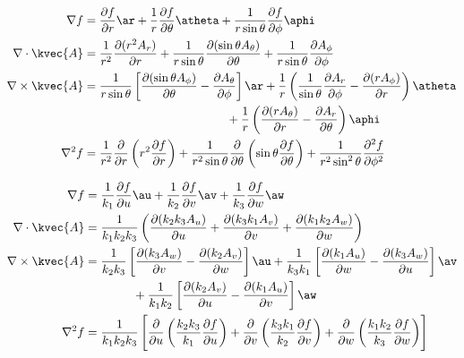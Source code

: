 \begin{align*}
\nabla f &=\frac{\partial f}{\partial r}\ar+\frac{1}{r}\frac{\partial f}{\partial \theta}\atheta+\frac{1}{r \sin \theta}\frac{\partial f}{\partial \phi}\aphi\\
\nabla \cdot \kvec{A}&=\frac{1}{r^2}\frac{\partial (r^2 A_r)}{\partial r}+\frac{1}{r \sin \theta }\frac{\partial ( \sin \theta A_{\theta})}{\partial \theta}+\frac{1}{r \sin \theta}\frac{\partial A_{\phi}}{\partial \phi}\\
\nabla \times \kvec{A}&=\frac{1}{r \sin \theta}\left[\frac{\partial (\sin \theta A_{\phi})}{\partial \theta}-\frac{\partial A_{\theta}}{\partial \phi} \right]\ar+\frac{1}{r}\left(\frac{1}{\sin \theta}\frac{\partial A_r}{\partial \phi}-\frac{\partial (r A_{\phi})}{\partial r} \right)\atheta\\
& \quad \quad \quad\quad \quad \quad\quad \quad \quad\quad \quad \quad +\frac{1}{r}\left(\frac{\partial (r A_{\theta})}{\partial r}-\frac{\partial A_r}{\partial \theta} \right)\aphi \\
\nabla^2 f &=\frac{1}{r^2}\frac{\partial}{\partial r}\left(r^2 \frac{\partial f}{\partial r} \right)+\frac{1}{r^2 \sin \theta}\frac{\partial}{\partial \theta}\left(\sin \theta \frac{\partial f}{\partial \theta} \right)+\frac{1}{r^2 \sin^2 \theta}\frac{\partial^2  f}{\partial {\phi}^2}
\end{align*}


\begin{align*}
\nabla f &=\frac{1}{k_1}\frac{\partial f}{\partial u}\au+\frac{1}{k_2}\frac{\partial f}{\partial v}\av+\frac{1}{k_3}\frac{\partial f}{\partial w}\aw\\
\nabla \cdot \kvec{A}&=\frac{1}{k_1 k_2 k_3}\left(\frac{\partial (k_2 k_3 A_u)}{\partial u}+\frac{\partial ( k_3 k_1 A_v)}{\partial v}+\frac{\partial (k_1 k_2 A_w)}{\partial w}\right)\\
\nabla \times \kvec{A}&=\frac{1}{k_2 k_3}\left[\frac{\partial (k_3 A_w)}{\partial v}-\frac{\partial (k_2 A_v)}{\partial w} \right]\au+\frac{1}{k_3 k_1}\left[\frac{\partial (k_1 A_u)}{\partial w}-\frac{\partial (k_3 A_w)}{\partial u} \right]\av\\
& \quad \quad \quad \quad +\frac{1}{k_1 k_2}\left[\frac{\partial (k_2 A_v)}{\partial u}-\frac{\partial (k_1 A_u)}{\partial v} \right]\aw \\
\nabla^2 f &=\frac{1}{k_1 k_2 k_3} \left[\frac{\partial}{\partial u}\left(\frac{k_2 k_3}{k_1}\frac{\partial f}{\partial u} \right)+\frac{\partial}{\partial v}\left(\frac{k_3 k_1}{k_2}\frac{\partial f}{\partial v} \right)+\frac{\partial}{\partial w}\left(\frac{k_1 k_2}{k_3}\frac{\partial f}{\partial w} \right)\right]
\end{align*}


